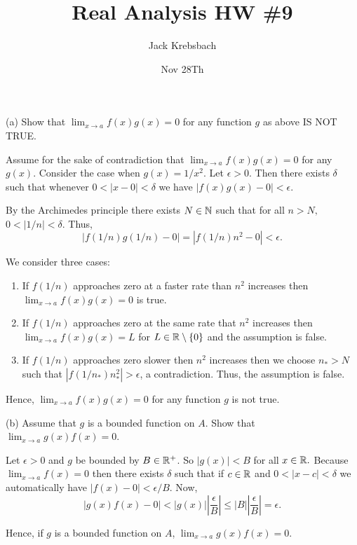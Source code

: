 \documentclass{report}
\title{Real Analysis HW \#9}
\author{Jack Krebsbach }
\date{Nov 28Th}
\begin{document}
\maketitle


(a) Show that $\lim _{x \rightarrow a} f(x) g(x)=0$ for any function $g$ as above IS NOT TRUE.

\begin{myproof}
     Assume for the sake of contradiction that $\lim _{x \rightarrow a} f(x) g(x)=0$ for  any $g(x).$ Consider the case when $g(x)= 1/x^2.$ Let $\epsilon >0.$ Then there exists $\delta$ such that whenever $0 < |x - 0| < \delta$ we have $|f(x)g(x) -0|<\epsilon.$

  By the Archimedes principle there exists $N \in \NN$ such that for all $n > N,$ $0 < |1/n| < \delta.$ Thus, $$ |f(1/n)g(1/n)-0|=|f(1/n)n^2 -0|<\epsilon.$$

  We consider three cases:

  \begin{enumerate}
    \item If $f(1/n)$ approaches zero at a faster rate than $n^2$ increases then $\lim _{x \rightarrow a} f(x) g(x)=0$ is true.
    \item If $f(1/n)$ approaches zero at the same rate that $n^2$ increases then $\lim _{x \rightarrow a} f(x) g(x)=L$ for $L \in \RR \setminus \{0\}$ and the assumption is false.
    \item   If $f(1/n)$ approaches zero slower then $n^2$ increases then we  choose $n_* > N$ such that $ |f(1/n_*)n_*^2| > \epsilon$, a contradiction. Thus, the assumption is false.
   \end{enumerate}
Hence, $\lim _{x \rightarrow a} f(x) g(x)=0$ for any function $g$ is not true.

\end{myproof}

\bigskip
\bigskip
\bigskip

(b) Assume that $g$ is a bounded function on $A$. Show that $\lim _{x \rightarrow a} g(x) f(x)=0$.

\begin{myproof}
    Let $\epsilon >0$ and $g$ be bounded by $B \in \RR^+$. So $|g(x)| < B$ for all $x \in \RR.$ Because $\lim _{x \rightarrow a} f(x)=0$ then there exists $\delta$ such that if $c\in \RR$ and $0 < | x -c | <\delta$ we automatically have $|f(x) - 0| <  \epsilon / B$.
Now, $$ |g(x)f(x) - 0| < |g(x)|\left|\frac{\epsilon}{B}\right| \leq |B|\left|\frac{\epsilon}{B}\right| = \epsilon.  $$

Hence, if $g$ is a bounded function on $A$, $\lim _{x \rightarrow a} g(x) f(x)=0.$
\end{myproof}
\end{document}
